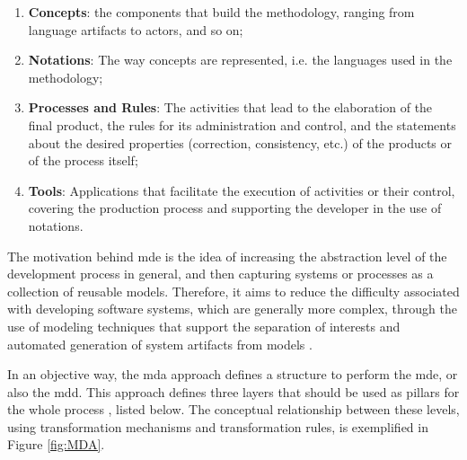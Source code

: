\begin{enumerate}
   \item \textbf{Concepts}: the components that build the methodology, ranging from language artifacts to actors, and so on;
   \item \textbf{Notations}: The way concepts are represented, i.e. the languages used in the methodology;
   \item \textbf{Processes and Rules}: The activities that lead to the elaboration of the final product, the rules for its administration and control, and the statements about the desired properties (correction, consistency, etc.) of the products or of the process itself;
   \item \textbf{Tools}: Applications that facilitate the execution of activities or their control, covering the production process and supporting the developer in the use of notations.
\end{enumerate}

The motivation behind \ac{mde} is the idea of increasing the abstraction level of the development process in general, and then capturing systems or processes as a collection of reusable models.
Therefore, it aims to reduce the difficulty associated with developing software systems, which are generally more complex, through the use of modeling techniques that support the separation of interests and automated generation of system artifacts from models \cite{Batory:2015, Kleppe:2003}.


In an objective way, the \ac{mda} approach defines a structure to perform the \ac{mde}, or also the \ac{mdd}.
This approach defines three layers that should be used as pillars for the whole process \cite{Frantz:2012}, listed below.
The conceptual relationship between these levels, using transformation mechanisms and transformation rules, is exemplified in Figure \ref{fig:MDA}.

